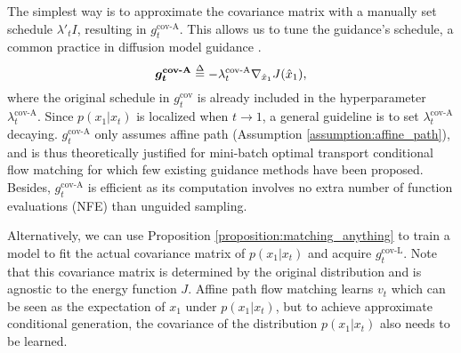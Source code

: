 The simplest way is to approximate the covariance matrix with a manually set schedule $\lambda'_t I$, resulting in $g_t^{\text{cov-A}}$. This allows us to tune the guidance's schedule, a common practice in diffusion model guidance \citep{song_loss-guided_2023,song_pseudoinverse-guided_2022}.
\begin{equation}\nonumber
    \bm{g_t}^{\textbf{cov-A}} \overset{\Delta}{=} -\lambda^{\text{cov-A}}_t \nabla_{\hat{x}_1}J(\hat{x}_1),
\end{equation}
where the original schedule in $g^{\text{cov}}_t$ is already included in the hyperparameter $\lambda^{\text{cov-A}}_t$. Since $p(x_1|x_t)$ is localized when $t\rightarrow 1$, a general guideline is to set $\lambda^{\text{cov-A}}_t$ decaying.
$g_t^{\text{cov-A}}$ only assumes affine path (Assumption \ref{assumption:affine_path}), and is thus theoretically justified for mini-batch optimal transport conditional flow matching \citep{tong_improving_2024} for which few existing guidance methods have been proposed.
Besides, $g_t^{\text{cov-A}}$ is efficient as its computation involves no extra number of function evaluations (NFE) than unguided sampling. 

Alternatively, we can use Proposition \ref{proposition:matching_anything} to train a model to fit the actual covariance matrix of $p(x_1|x_t)$ and acquire $g_t^{\text{cov-L}}$. Note that this covariance matrix is determined by the original distribution and is agnostic to the energy function $J$. Affine path flow matching learns $v_{t}$ which can be seen as the expectation of $x_1$ under $p(x_1|x_t)$, but to achieve approximate conditional generation, the covariance of the distribution $p(x_1|x_t)$ also needs to be learned.








